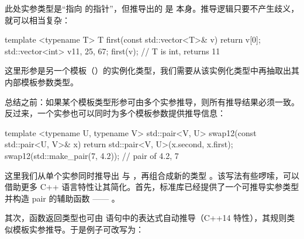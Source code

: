 此处实参类型是“指向  的指针”，但推导出的  是  本身。推导逻辑只要不产生歧义，就可以相当复杂：

\begin{code}
template <typename T> T first(const std::vector<T>& v) {
  return v[0];
}
std::vector<int> v{11, 25, 67};
first(v);    // T is int, returns 11
\end{code}

这里形参是另一个模板（）的实例化类型，我们需要从该实例化类型中再抽取出其内部模板参数类型。

总结之前：如果某个模板类型形参可由多个实参推导，则所有推导结果必须一致。反过来，一个实参也可以同时为多个模板参数提供推导信息：

\begin{code}
template <typename U, typename V>
std::pair<V, U> swap12(const std::pair<U, V>& x) {
  return std::pair<V, U>(x.second, x.first);
}
swap12(std::make_pair(7, 4.2)); // pair of 4.2, 7
\end{code}

这里我们从单个实参同时推导出  与 ，再组合成新的类型 。该写法有些啰嗦，可以借助更多 C++ 语言特性让其简化。首先，标准库已经提供了一个可推导实参类型并构造 pair 的辅助函数 —— 。

其次，函数返回类型也可由  语句中的表达式自动推导（C++14 特性），其规则类似模板实参推导。于是例子可改写为：

